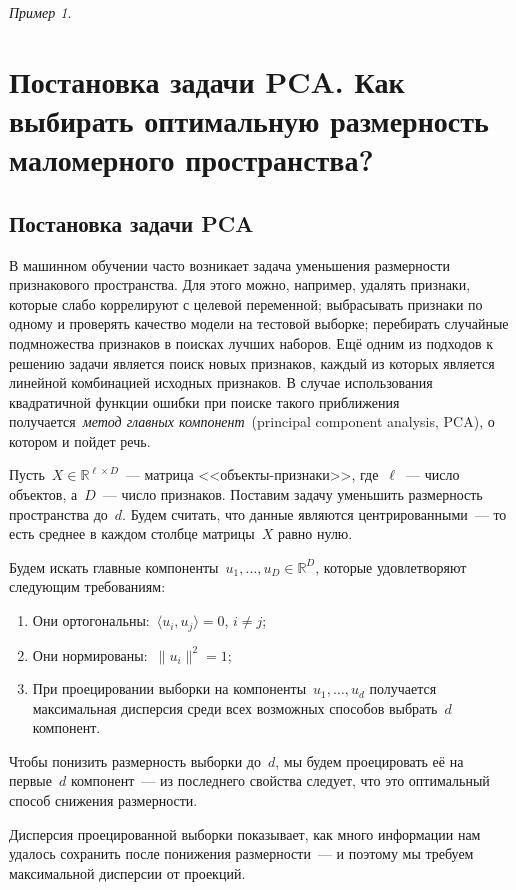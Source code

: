 \documentclass[a4paper, 12pt]{article}
\theoremstyle{plain} %
\theoremstyle{definition} %
\theoremstyle{remark} %
\newtheorem{example}{Пример}
\begin{document}
\begin{example}
\section{Постановка задачи PCA. Как выбирать оптимальную размерность маломерного пространства?}

\subsection{Постановка задачи PCA}

В машинном обучении часто возникает задача уменьшения размерности
признакового пространства.
Для этого можно, например, удалять признаки, которые слабо коррелируют с целевой переменной;
выбрасывать признаки по одному и проверять качество модели на тестовой выборке;
перебирать случайные подмножества признаков в поисках лучших наборов.
Ещё одним из подходов к решению задачи является поиск новых признаков,
каждый из которых является линейной комбинацией исходных признаков.
В случае использования квадратичной функции ошибки при поиске
такого приближения получается~\emph{метод главных компонент}~(principal
component analysis, PCA),
о котором и пойдет речь.

Пусть~$X \in \mathbb{R}^{\ell \times D}$~--- матрица <<объекты-признаки>>,
где~$\ell$~--- число объектов, а~$D$~--- число признаков.
Поставим задачу уменьшить размерность пространства до~$d$.
Будем считать, что данные являются центрированными~--- то есть среднее
в каждом столбце матрицы~$X$ равно нулю.

Будем искать главные компоненты~$u_1, \dots, u_D \in \mathbb{R}^D$, которые удовлетворяют
следующим требованиям:
\begin{enumerate}
    \item Они ортогональны:~$\langle u_i, u_j \rangle = 0$, $i \neq j$;
    \item Они нормированы:~$\|u_i\|^2 = 1$;
    \item При проецировании выборки на компоненты~$u_1, \dots, u_d$ получается
        максимальная дисперсия среди всех возможных способов выбрать~$d$ компонент.
\end{enumerate}

Чтобы понизить размерность выборки до~$d$, мы будем проецировать её на первые~$d$ компонент~---
из последнего свойства следует, что это оптимальный способ снижения размерности.

Дисперсия проецированной выборки показывает, как много информации нам удалось сохранить после
понижения размерности~--- и поэтому мы требуем максимальной дисперсии от проекций.


\end{example}
\end{document}
